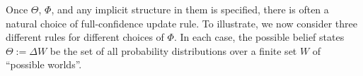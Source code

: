 \begin{subappendices}
    Once $\Theta$, $\Phi$, and any implicit structure in them is specified, there is often a natural choice of full-confidence update rule.
    To illustrate, we now consider three different rules for different choices of $\Phi$.
    In each case, the possible belief states $\Theta := \Delta W$ be the set of all probability distributions over a finite set
     $W
      $ of ``possible worlds''.


\end{subappendices}

